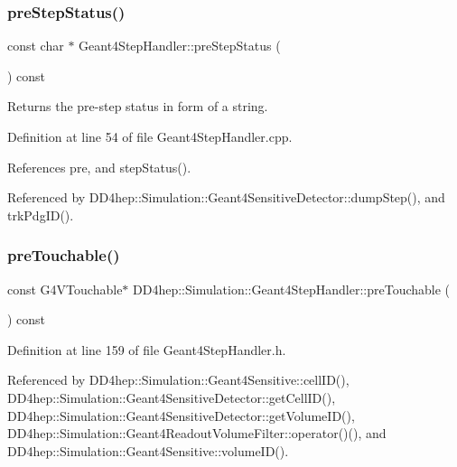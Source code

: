 \subsubsection{\texorpdfstring{pre\+Step\+Status()}{preStepStatus()}}
{\footnotesize\ttfamily const char $\ast$ Geant4\+Step\+Handler\+::pre\+Step\+Status (\begin{DoxyParamCaption}{ }\end{DoxyParamCaption}) const}



Returns the pre-\/step status in form of a string. 



Definition at line 54 of file Geant4\+Step\+Handler.\+cpp.



References pre, and step\+Status().



Referenced by D\+D4hep\+::\+Simulation\+::\+Geant4\+Sensitive\+Detector\+::dump\+Step(), and trk\+Pdg\+I\+D().

\hypertarget{class_d_d4hep_1_1_simulation_1_1_geant4_step_handler_ad2ab7468011fc1d570e24345d458b7fc}{}\label{class_d_d4hep_1_1_simulation_1_1_geant4_step_handler_ad2ab7468011fc1d570e24345d458b7fc} 
\subsubsection{\texorpdfstring{pre\+Touchable()}{preTouchable()}}
{\footnotesize\ttfamily const G4\+V\+Touchable$\ast$ D\+D4hep\+::\+Simulation\+::\+Geant4\+Step\+Handler\+::pre\+Touchable (\begin{DoxyParamCaption}{ }\end{DoxyParamCaption}) const\hspace{0.3cm}{\ttfamily [inline]}}



Definition at line 159 of file Geant4\+Step\+Handler.\+h.



Referenced by D\+D4hep\+::\+Simulation\+::\+Geant4\+Sensitive\+::cell\+I\+D(), D\+D4hep\+::\+Simulation\+::\+Geant4\+Sensitive\+Detector\+::get\+Cell\+I\+D(), D\+D4hep\+::\+Simulation\+::\+Geant4\+Sensitive\+Detector\+::get\+Volume\+I\+D(), D\+D4hep\+::\+Simulation\+::\+Geant4\+Readout\+Volume\+Filter\+::operator()(), and D\+D4hep\+::\+Simulation\+::\+Geant4\+Sensitive\+::volume\+I\+D().

